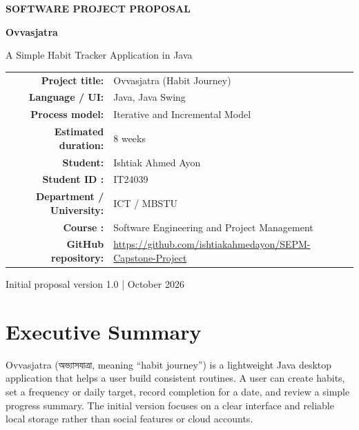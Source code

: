 \documentclass[11pt,a4paper]{article}
\begin{document}
\begin{titlepage}
\centering
\vspace*{1.1cm}
{\Large\bfseries SOFTWARE PROJECT PROPOSAL\par}
\vspace{1.0cm}
{\Huge\bfseries\color{teal} Ovvasjatra\par}
\vspace{0.25cm}
{\Large A Simple Habit Tracker Application in Java\par}
\vspace{0.8cm}
\vspace{1.0cm}

\begin{tabular}{>{\bfseries}rl}
Project title: & Ovvasjatra (Habit Journey)\\
Language / UI: & Java, Java Swing\\
Process model: & Iterative and Incremental Model\\
Estimated duration: & 8 weeks\\
Student: & Ishtiak Ahmed Ayon\\
Student ID : & IT24039 \\
Department / University: & ICT / MBSTU\\
Course : & Software Engineering and Project Management\\
GitHub repository: & \url{https://github.com/ishtiakahmedayon/SEPM-Capstone-Project}
\end{tabular}

\vfill
{\small Initial proposal version 1.0 \quad| October 2026}
\end{titlepage}

\tableofcontents
\newpage

\section{Executive Summary}
Ovvasjatra (অভ্যাসযাত্রা, meaning ``habit journey'') is a lightweight Java desktop application that helps a user build consistent routines. A user can create habits, set a frequency or daily target, record completion for a date, and review a simple progress summary. The initial version focuses on a clear interface and reliable local storage rather than social features or cloud accounts.
\end{document}
